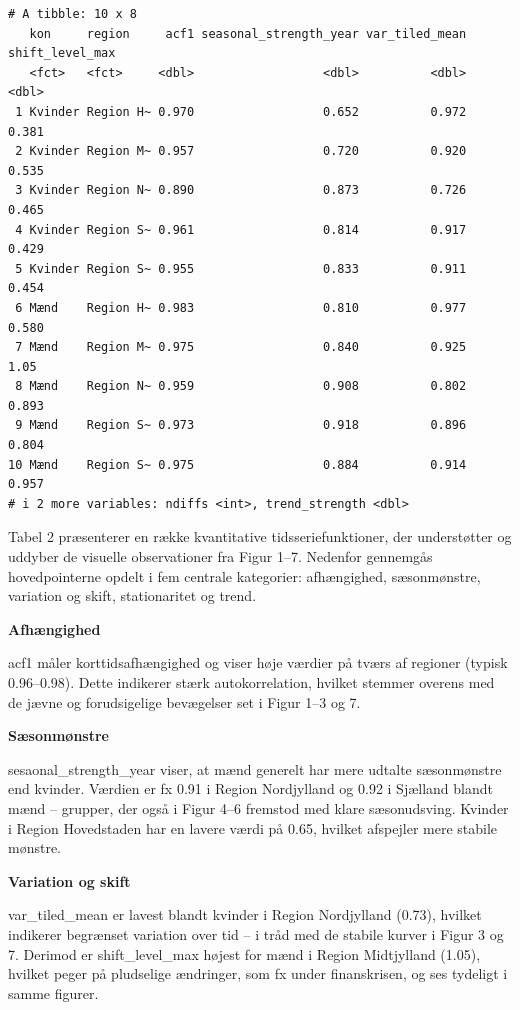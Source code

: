\documentclass[
]{article}
\begin{document}
\begin{verbatim}
# A tibble: 10 x 8
   kon     region     acf1 seasonal_strength_year var_tiled_mean shift_level_max
   <fct>   <fct>     <dbl>                  <dbl>          <dbl>           <dbl>
 1 Kvinder Region H~ 0.970                  0.652          0.972           0.381
 2 Kvinder Region M~ 0.957                  0.720          0.920           0.535
 3 Kvinder Region N~ 0.890                  0.873          0.726           0.465
 4 Kvinder Region S~ 0.961                  0.814          0.917           0.429
 5 Kvinder Region S~ 0.955                  0.833          0.911           0.454
 6 Mænd    Region H~ 0.983                  0.810          0.977           0.580
 7 Mænd    Region M~ 0.975                  0.840          0.925           1.05 
 8 Mænd    Region N~ 0.959                  0.908          0.802           0.893
 9 Mænd    Region S~ 0.973                  0.918          0.896           0.804
10 Mænd    Region S~ 0.975                  0.884          0.914           0.957
# i 2 more variables: ndiffs <int>, trend_strength <dbl>
\end{verbatim}

Tabel 2 præsenterer en række kvantitative tidsseriefunktioner, der
understøtter og uddyber de visuelle observationer fra Figur 1--7.
Nedenfor gennemgås hovedpointerne opdelt i fem centrale kategorier:
afhængighed, sæsonmønstre, variation og skift, stationaritet og trend.

\textbf{Afhængighed}

acf1 måler korttidsafhængighed og viser høje værdier på tværs af
regioner (typisk 0.96--0.98). Dette indikerer stærk autokorrelation,
hvilket stemmer overens med de jævne og forudsigelige bevægelser set i
Figur 1--3 og 7.

\textbf{Sæsonmønstre}

sesaonal\_strength\_year viser, at mænd generelt har mere udtalte
sæsonmønstre end kvinder. Værdien er fx 0.91 i Region Nordjylland og
0.92 i Sjælland blandt mænd -- grupper, der også i Figur 4--6 fremstod
med klare sæsonudsving. Kvinder i Region Hovedstaden har en lavere værdi
på 0.65, hvilket afspejler mere stabile mønstre.

\textbf{Variation og skift}

var\_tiled\_mean er lavest blandt kvinder i Region Nordjylland (0.73),
hvilket indikerer begrænset variation over tid -- i tråd med de stabile
kurver i Figur 3 og 7. Derimod er shift\_level\_max højest for mænd i
Region Midtjylland (1.05), hvilket peger på pludselige ændringer, som fx
under finanskrisen, og ses tydeligt i samme figurer.
\end{document}
